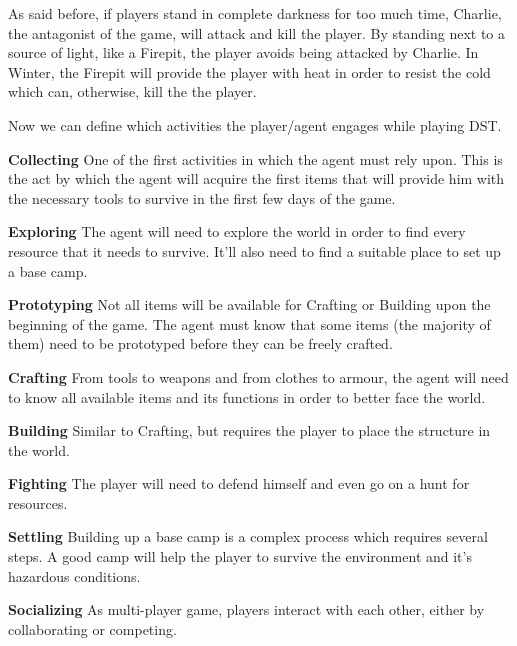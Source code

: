 As said before, if players stand in complete darkness for too much time, Charlie, the antagonist of the game, will attack and kill the player.
By standing next to a source of light, like a Firepit, the player avoids being attacked by Charlie.
In Winter, the Firepit will provide the player with heat in order to resist the cold which can, otherwise, kill the the player.

Now we can define which activities the player/agent engages while playing \ac{DST}.

\begin{description}
	\item \textbf{Collecting} One of the first activities in which the agent must rely upon.
This is the act by which the agent will acquire the first items that will provide him with the necessary tools to survive in the first few days of the game.
	\item \textbf{Exploring} The agent will need to explore the world in order to find every resource that it needs to survive.
	It'll also need to find a suitable place to set up a base camp.
	\item \textbf{Prototyping} Not all items will be available for Crafting or Building upon the beginning of the game.
	The agent must know that some items (the majority of them) need to be prototyped before they can be freely crafted.
	\item \textbf{Crafting} From tools to weapons and from clothes to armour, the agent will need to know all available items and its functions in order to better face the world.
	\item \textbf{Building} Similar to Crafting, but requires the player to place the structure in the world.
	\item \textbf{Fighting} The player will need to defend himself and even go on a hunt for resources.
	\item \textbf{Settling} Building up a base camp is a complex process which requires several steps.
	A good camp will help the player to survive the environment and it's hazardous conditions.
	\item \textbf{Socializing} As multi-player game, players interact with each other, either by collaborating or competing.
\end{description}